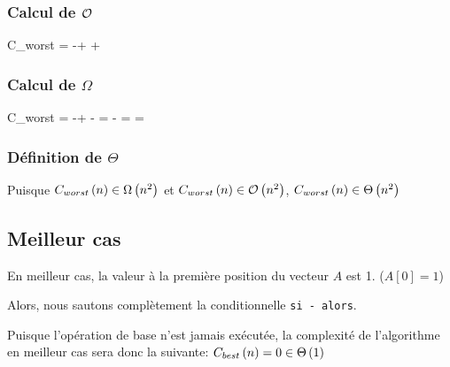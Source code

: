 \documentclass[class=article]{standalone}
\begin{document}
\subsubsection*{Calcul de $\mathcal{O}$}
\begin{deriv}
    C_{worst}
    \<=
    -+
    \<\leq
    +
    \<\in
    \BigO{}
\end{deriv}

\subsubsection*{Calcul de $\Omega$}
\begin{deriv}
    C_{worst}
    \<=
    -+
    \<\geq
    -
    \<= 
    -
    \<= 
    \<\geq 
    \<=
    \<\in
    \Omega{}
\end{deriv}

\subsubsection*{Définition de $\Theta$}
Puisque $C_{worst}\left ( n \right ) \in \Omega\left ( n^2 \right )$ et $C_{worst}\left ( n \right ) \in \mathcal{O}\left ( n^2 \right )$,
$C_{worst}\left ( n \right ) \in \Theta\left ( n^2 \right )$

\subsection*{Meilleur cas}

En meilleur cas, la valeur à la première position du vecteur $A$ est 1. ($A[0] = 1$)

Alors, nous sautons complètement la conditionnelle \lstinline{si - alors}.

Puisque l'opération de base n'est jamais exécutée,
la complexité de l'algorithme en meilleur cas sera donc la suivante:
$C_{best}\left ( n \right ) = 0 \in \Theta\left ( 1 \right )$
\end{document}
